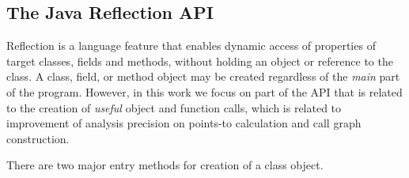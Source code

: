 \documentclass{llncs}
\begin{document}
\subsection*{The Java Reflection API}

Reflection is a language feature that enables dynamic access of properties of target classes, fields and methods, without holding an object or reference to the class. A class, field, or method object may be created regardless of the \emph{main} part of the program. However, in this work we focus on part of the API that is related to the creation of \emph{useful} object and function calls, which is related to improvement of analysis precision on points-to calculation and call graph construction.

There are two major entry methods for creation of a class object. 



%


\end{document}
